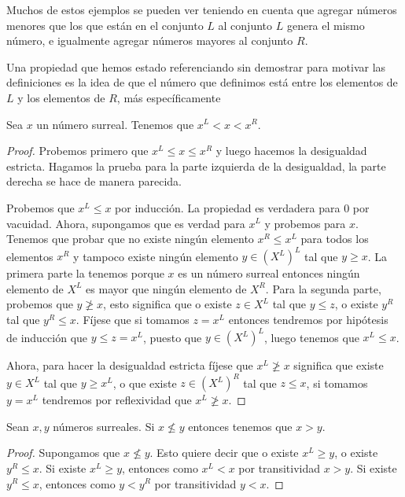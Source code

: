     Muchos de estos ejemplos se pueden ver teniendo en cuenta que agregar n\'umeros menores que los que est\'an en el conjunto $L$ al conjunto $L$ genera el mismo n\'umero, e igualmente agregar n\'umeros mayores al conjunto $R$.

    Una propiedad que hemos estado referenciando sin demostrar para motivar las definiciones es la idea de que el n\'umero que definimos est\'a entre los elementos de $L$ y los elementos de $R$, m\'as espec\'ificamente

    \begin{theorem}
        Sea $x$ un n\'umero surreal. Tenemos que $x^L < x < x^R$.
    \end{theorem}

    \begin{proof}
        Probemos primero que $x^L \le x \le x^R$ y luego hacemos la desigualdad estricta. Hagamos la prueba para la parte izquierda de la desigualdad, la parte derecha se hace de manera parecida.

        Probemos que $x^L \le x$ por inducci\'on. La propiedad es verdadera para $0$ por vacuidad. Ahora, supongamos que es verdad para $x^L$ y probemos para $x$. Tenemos que probar que no existe ning\'un elemento $x^R \le x^L$ para todos los elementos $x^R$ y tampoco existe ningún elemento $y\in (X^L)^L$ tal que $y \ge x$. La primera parte la tenemos porque $x$ es un n\'umero surreal entonces ning\'un elemento de $X^L$ es mayor que ning\'un elemento de $X^R$. Para la segunda parte, probemos que $y \not\ge x$, esto significa que o existe $z\in X^L$ tal que $y\le z$, o existe $y^R$ tal que $y^R\le x$. F\'ijese que si tomamos $z = x^L$ entonces tendremos por hip\'otesis de inducci\'on que $y\le z = x^L$, puesto que $y\in (X^L)^L$, luego tenemos que $x^L\le x$.

        Ahora, para hacer la desigualdad estricta f\'ijese que $x^L \not\ge x$ significa que existe $y\in X^L$ tal que $y\ge x^L$, o que existe $z\in (X^L)^R$ tal que $z\le x$, si tomamos $y=x^L$ tendremos por reflexividad que $x^L\not\ge x$.
    \end{proof}

    \begin{corollary}[Linealidad]
        Sean $x, y$ n\'umeros surreales. Si $x \not\le y$ entonces tenemos que $x > y$. 
    \end{corollary}

    \begin{proof}
        Supongamos que $x\not\le y$. Esto quiere decir que o existe $x^L \ge y$, o existe $y^R \le x$. Si existe $x^L \ge y$, entonces como $x^L < x$ por transitividad $x > y$. Si existe $y^R \le x$, entonces como $y < y^R$ por transitividad $y < x$.
    \end{proof}

